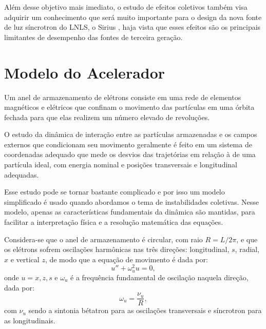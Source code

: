 Além desse objetivo mais imediato, o estudo de efeitos coletivos também visa adquirir um conhecimento que será muito importante para o design da nova fonte de luz síncrotron do LNLS, o Sirius \cite{Sirius}, haja vista que esses efeitos são os principais limitantes de desempenho das fontes de terceira geração.


\section{Modelo do Acelerador}
Um anel de armazenamento de elétrons consiste em uma rede de elementos magnéticos e elétricos que confinam o movimento das partículas em uma órbita fechada para que elas realizem um número elevado de revoluções.

O estudo da dinâmica de interação entre as partículas armazenadas e os campos externos que condicionam seu movimento geralmente é feito em um sistema de coordenadas adequado que mede os desvios das trajetórias em relação à de uma partícula ideal, com energia nominal e posições transversais e longitudinal adequadas.

Esse estudo pode se tornar bastante complicado e por isso um modelo simplificado é usado quando abordamos o tema de instabilidades coletivas. Nesse modelo, apenas as características fundamentais da dinâmica são mantidas, para facilitar a interpretação física e a resolução matemática das equações.

Considera-se que o anel de armazenamento é circular, com raio $R = L/2\pi$, e que os elétrons sofrem oscilações harmônicas nas três direções: longitudinal, $s$, radial, $x$ e vertical $z$, de modo que a equação de movimento é dada por:
\begin{equation}\label{modelo}
 u'' + \omega_u^2 u = 0,
\end{equation}
onde $u = x, z, s$ e $\omega_u$ é a frequência fundamental de oscilação naquela direção, dada por:
\begin{equation}\nonumber
  \omega_u = \frac{\nu_u}{R},
\end{equation}
com $\nu_u$ sendo a sintonia bétatron para as oscilações transversais e síncrotron para as longitudinais.

